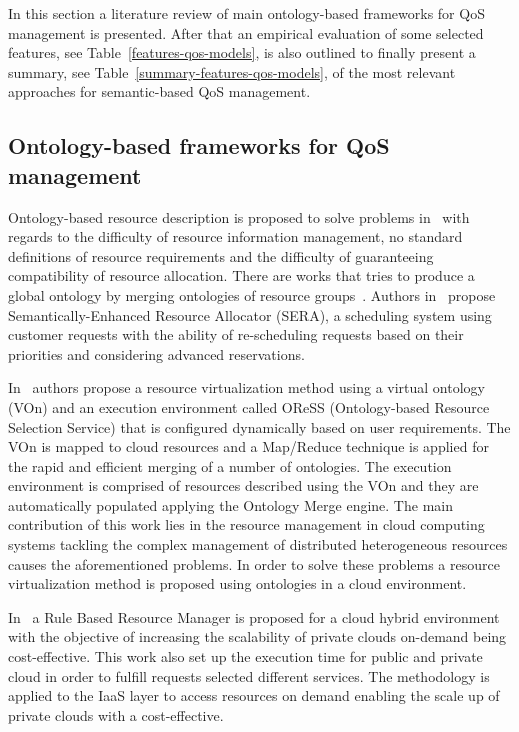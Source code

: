 In this section a literature review of main ontology-based frameworks for QoS management is presented. After that 
an empirical evaluation of some selected features, see Table~\ref{features-qos-models}, is also outlined to finally present 
a summary, see Table~\ref{summary-features-qos-models}, of the most relevant approaches for semantic-based QoS management.
\subsection{Ontology-based frameworks for QoS management}
Ontology-based resource description is proposed to solve problems in~\cite{Pernas:2005:UOD:1068510.1069326,Armstrong17} with regards to the difficulty of 
resource information management, no standard definitions of resource requirements and the difficulty of guaranteeing compatibility of resource allocation. 
There are works that tries to produce a global ontology by merging ontologies of resource groups~\cite{Lopes:2006:PEM:1135771.1136110}. 
Authors in~\cite{Ejarque:2008:USR:1443230.1444322} propose Semantically-Enhanced Resource Allocator (SERA), a scheduling system using customer 
requests with the ability of re-scheduling requests based on their priorities and considering advanced reservations.

In~\cite{2009gdc..conf..221Y} authors propose a resource virtualization method using a virtual ontology (VOn) and an execution environment called OReSS 
(Ontology-based Resource Selection Service) that is configured dynamically based on user requirements. The VOn is mapped to cloud resources 
and a Map/Reduce technique is applied for the rapid and efficient merging of a number of ontologies. The execution environment is comprised of resources 
described using the VOn and they are automatically populated applying the Ontology Merge engine. The main contribution of this work lies in 
the resource management in cloud computing systems tackling the complex management of distributed heterogeneous resources causes the aforementioned problems. 
In order to solve these problems a resource virtualization method is proposed using ontologies in a cloud environment. 

In~\cite{rule-2013-resource-provisioning} a Rule Based Resource Manager is proposed for a cloud hybrid environment with the objective of increasing the scalability of private 
clouds on-demand being cost-effective. This work also set up the execution time for public and private cloud in order to fulfill requests selected different services. 
The methodology is applied to the IaaS layer to access resources on demand enabling the scale up of private clouds with a cost-effective.

